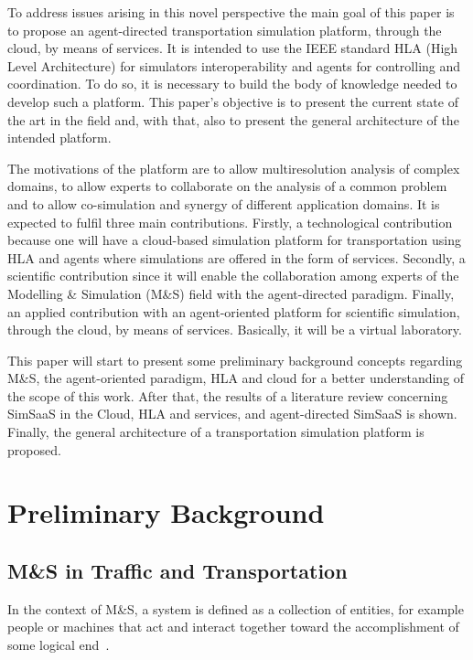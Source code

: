 \documentclass[conference]{IEEEtran}
\begin{document}
To address issues arising in this novel perspective the main goal of this paper is to propose an agent-directed transportation simulation platform, through the cloud, by means of services. It is intended to use the IEEE standard HLA (High Level Architecture) for simulators interoperability and agents for controlling and coordination. To do so, it is necessary to build the body of knowledge needed to develop such a platform. This paper's objective is to present the current state of the art in the field and, with that, also to present the general architecture of the intended platform.

The motivations of the platform are to allow multiresolution analysis of complex domains, to allow experts to collaborate on the analysis of a common problem and to allow co-simulation and synergy of different application domains. It is expected to fulfil three main contributions. Firstly, a technological contribution because one will have a cloud-based simulation platform for transportation using HLA and agents where simulations are offered in the form of services. Secondly, a scientific contribution since it will enable the collaboration among experts of the Modelling \& Simulation (M\&S) field with the agent-directed paradigm. Finally, an applied contribution with an agent-oriented platform for scientific simulation, through the cloud, by means of services. Basically, it will be a virtual laboratory.

This paper will start to present some preliminary background concepts regarding M\&S, the agent-oriented paradigm, HLA and cloud for a better understanding of the scope of this work. After that, the results of a literature review concerning SimSaaS in the Cloud, HLA and services, and agent-directed SimSaaS is shown. Finally, the general architecture of a transportation simulation platform is proposed.

\section{Preliminary Background}

\subsection{M\&S in Traffic and Transportation}
In the context of M\&S, a system is defined as a collection of entities, for example people or machines that act and interact together toward the accomplishment of some logical end~\cite{schmidt1970simulation}.
\end{document}
